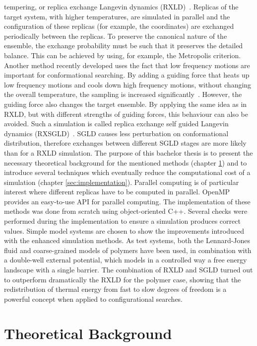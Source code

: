 \documentclass[a4paper]{article}
\begin{document}
tempering, or replica exchange Langevin dynamics (RXLD)~\cite{YujiSugita1999}. Replicas of the target system, with higher temperatures, are simulated in parallel and the configuration of these replicas (for example, the coordinates) are exchanged periodically between the replicas. To preserve the canonical nature of the ensemble, the exchange probability must be such that it preserves the detailed balance. This can be achieved by using, for example, the Metropolis criterion. Another method recently developed uses the fact that low frequency motions are important for conformational searching. By adding a guiding force that heats up low frequency motions and cools down high frequency motions, without changing the overall temperature, the sampling is increased significantly~\cite{XiongwuWu2003}. However, the guiding force also changes the target ensemble. By applying the same idea as in RXLD, but with different strengths of guiding forces, this behaviour can also be avoided. Such a simulation is called replica exchange self guided Langevin dynamics (RXSGLD)~\cite{XiongwuWu2012}. SGLD causes less perturbation on conformational distribution, therefore exchanges between different SGLD stages are more likely than for a RXLD simulation. The purpose of this bachelor thesis is to present the necessary theoretical background for the mentioned methods (chapter \ref{sec:theoretical}) and to introduce several techniques which eventually reduce the computational cost of a simulation (chapter \ref{sec:implementation}). Parallel computing is of particular interest where different replicas have to be computed in parallel. OpenMP provides an easy-to-use API for parallel computing. The implementation of these methods was done from scratch using object-oriented C++. Several checks were performed during the implementation to ensure a simulation produces correct values.  Simple model systems are chosen to show the improvements introduced with the enhanced simulation methods. As test systems, both the Lennard-Jones fluid and coarse-grained models of polymers have been used, in combination with a double-well external potential, which models in a controlled way a free energy landscape with a single barrier.  The combination of RXLD and SGLD turned out to outperform dramatically the RXLD for the polymer case, showing that the redistribution of thermal energy from fast to slow degrees of freedom is a powerful concept when applied to configurational searches.
\section{Theoretical Background}
\label{sec:theoretical}
\end{document}
